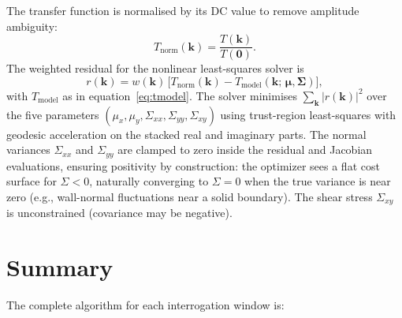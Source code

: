 \documentclass[11pt,a4paper]{article}
\newcommand{\kv}{\mathbf{k}}
\newcommand{\muv}{\bm{\mu}}
\newcommand{\Sigv}{\bm{\Sigma}}
\begin{document}
The transfer function is normalised by its DC value to remove amplitude ambiguity:
%
\begin{equation}
    T_\mathrm{norm}(\kv) = \frac{T(\kv)}{T(\mathbf{0})}.
    \label{eq:tnorm}
\end{equation}
%
The weighted residual for the nonlinear least-squares solver is
%
\begin{equation}
    r(\kv) = w(\kv)\,\bigl[T_\mathrm{norm}(\kv) - T_\mathrm{model}(\kv;\, \muv, \Sigv)\bigr],
    \label{eq:residual}
\end{equation}
%
with $T_\mathrm{model}$ as in equation~\eqref{eq:tmodel}.
The solver minimises $\sum_\kv \lvert r(\kv)\rvert^2$ over the five parameters $(\mu_x, \mu_y, \Sigma_{xx}, \Sigma_{yy}, \Sigma_{xy})$ using trust-region least-squares with geodesic acceleration on the stacked real and imaginary parts.
The normal variances $\Sigma_{xx}$ and $\Sigma_{yy}$ are clamped to zero inside the residual and Jacobian evaluations, ensuring positivity by construction: the optimizer sees a flat cost surface for $\Sigma < 0$, naturally converging to $\Sigma = 0$ when the true variance is near zero (e.g., wall-normal fluctuations near a solid boundary).
The shear stress $\Sigma_{xy}$ is unconstrained (covariance may be negative).

\section{Summary}
\label{sec:summary}

The complete algorithm for each interrogation window is:
\end{document}
